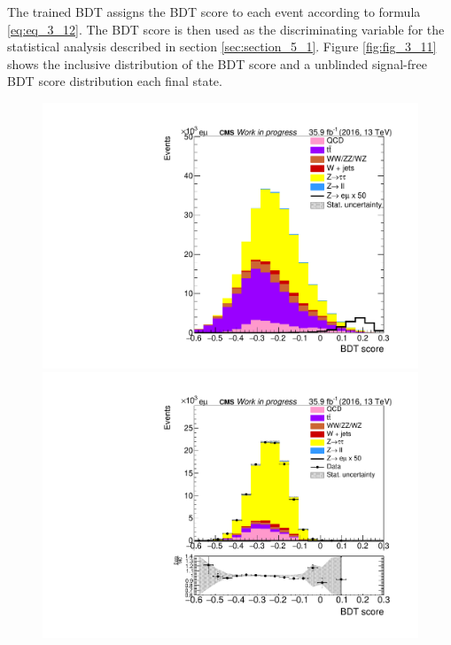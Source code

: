 The trained \gls{BDT} assigns the \gls{BDT} score to each event according to formula \ref{eq:eq_3_12}. The \gls{BDT} score is then used as the discriminating variable for the statistical analysis described in section \ref{sec:section_5_1}. Figure \ref{fig:fig_3_11} shows the inclusive distribution of the \gls{BDT} score and a unblinded signal-free \gls{BDT} score distribution each final state. \\

 
\begin{figure}[htp]
	\centering

	\begin{multicols}{2}
		\includegraphics[width=\linewidth]{plots/em/BDTScore.pdf}\par 
		\includegraphics[width=\linewidth]{plots/em/BDTScore_ZTTCR}\par
	\end{multicols}


\end{figure}
